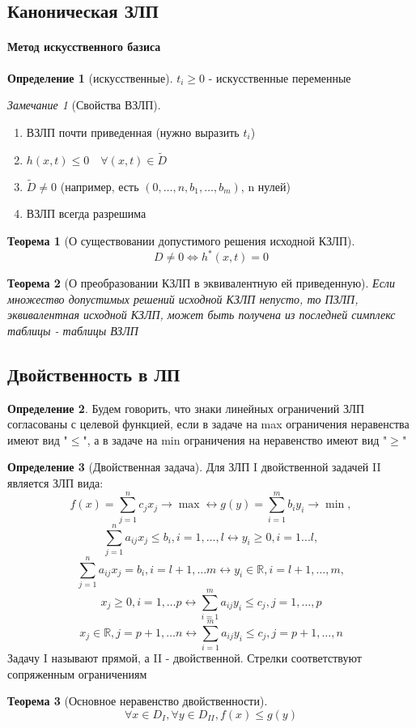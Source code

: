 \documentclass[a4paper]{article}
\newtheorem{theorem}{Теорема}[section]
\theoremstyle{definition}
\newtheorem*{definition}{Определение}
\theoremstyle{remark}
\newtheorem*{remark}{Замечание}
\begin{document}
\subsection{Каноническая ЗЛП}
\paragraph*{Метод искусственного базиса}
\begin{definition}[искусственные]
    $t_i\geq 0$ - искусственные переменные
\end{definition}
\begin{remark}[Свойства ВЗЛП]
    \begin{enumerate}
        \item ВЗЛП почти приведенная (нужно выразить $t_i$)
        \item $h(x, t) \leq 0 \quad \forall (x, t)\in \widetilde{D}$
        \item $\widetilde{D}\neq 0$ (например, есть $(0, \dots, n, b_1, \dots, b_m)$, n нулей)
        \item ВЗЛП всегда разрешима 
    \end{enumerate}
\end{remark}
\begin{theorem}[О существовании допустимого решения исходной КЗЛП]
    $$D\neq 0 \Leftrightarrow h^*(x, t)=0$$
\end{theorem}
\begin{theorem}[О преобразовании КЗЛП в эквивалентную ей приведенную]
    Если множество допустимых решений исходной КЗЛП непусто, то ПЗЛП, эквивалентная исходной КЗЛП, может быть получена из последней симплекс таблицы - таблицы ВЗЛП
\end{theorem}
\subsection{Двойственность в ЛП}
\begin{definition}
    Будем говорить, что знаки линейных ограничений ЗЛП согласованы с целевой функцией, если в задаче на max ограничения неравенства имеют вид "$\leq$", а в задаче на min ограничения на неравенство имеют вид "$\geq$"
\end{definition}
\begin{definition}[Двойственная задача]
    Для ЗЛП I двойственной задачей II является ЗЛП вида:
        $$f(x) = \sum_{j = 1}^n c_j x_j \to \max \leftrightarrow g(y) = \sum_{i = 1}^m b_i y_i\to \min,$$
        $$\sum_{j = 1}^n a_{ij} x_j \leq b_i, i = 1, \dots, l \leftrightarrow y_i\geq 0, i = 1...l,$$
        $$\sum_{j = 1}^n a_{ij} x_j = b_i, i = l+1, \dots m \leftrightarrow y_i\in \mathbb{R}, i = l+1, \dots, m,$$
        $$x_j\geq 0, i = 1, \dots p\leftrightarrow \sum_{i = 1}^m a_{ij} y_i \leq c_j, j = 1, \dots, p$$
        $$x_j \in \mathbb{R}, j = p+1, \dots n \leftrightarrow \sum_{i = 1}^m a_{ij} y_i \leq c_j, j = p+1, \dots, n$$
        Задачу I называют прямой, а II - двойственной. Стрелки соответствуют сопряженным ограничениям
\end{definition}
\begin{theorem}[Основное неравенство двойственности]
    $$\forall x\in D_I, \forall y\in D_{II}, f(x)\leq g(y)$$
\end{theorem}
\end{document}
